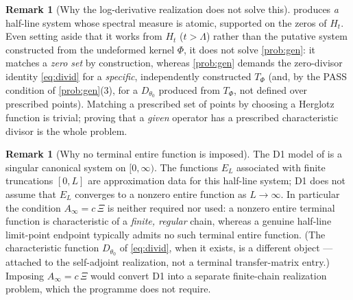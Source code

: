 \documentclass[12pt,a4paper]{amsart}
\theoremstyle{plain}
\theoremstyle{definition}
\newtheorem{remark}[theorem]{Remark}
\begin{document}
\begin{remark}[Why the log-derivative realization does not solve this]\label{rem:not-trivial}
   produces \emph{a} half-line system whose spectral
  measure is atomic, supported on the zeros of $H_t$.  Even setting aside
  that it works from $H_t$ ($t>\Lambda$) rather than the putative system
  constructed from the undeformed kernel $\Phi$, it does not solve
  \cref{prob:gen}: it matches a \emph{zero set} by construction, whereas
  \cref{prob:gen} demands the zero-divisor identity \cref{eq:divid} for a
  \emph{specific}, independently constructed $T_\Phi$ (and, by the PASS
  condition of \cref{prob:gen}(3), for a $D_{\theta_0}$ produced from
  $T_\Phi$, not defined over prescribed points).  Matching a prescribed
  set of points by choosing a Herglotz function is trivial; proving that a
  \emph{given} operator has a prescribed characteristic divisor is the
  whole problem.
\end{remark}

\begin{remark}[Why no terminal entire function is imposed]\label{rem:incompat}
  The D1 model of \cite{SpecRoadmap} is a singular canonical system on
  $[0,\infty)$.  The functions $E_L$ associated with finite truncations
  $[0,L]$ are approximation data for this half-line system; D1 does not
  assume that $E_L$ converges to a nonzero entire function as
  $L\to\infty$.  In particular the condition $A_\infty = c\,\Xi$ is
  neither required nor used: a nonzero entire terminal function is
  characteristic of a \emph{finite, regular} chain, whereas a genuine
  half-line limit-point endpoint typically admits no such terminal entire
  function.  (The characteristic function $D_{\theta_0}$ of
  \cref{eq:divid}, when it exists, is a different object --- attached to
  the self-adjoint realization, not a terminal transfer-matrix entry.)
  Imposing $A_\infty=c\,\Xi$ would convert D1 into a separate finite-chain
  realization problem, which the programme does not require.
\end{remark}
\end{document}
